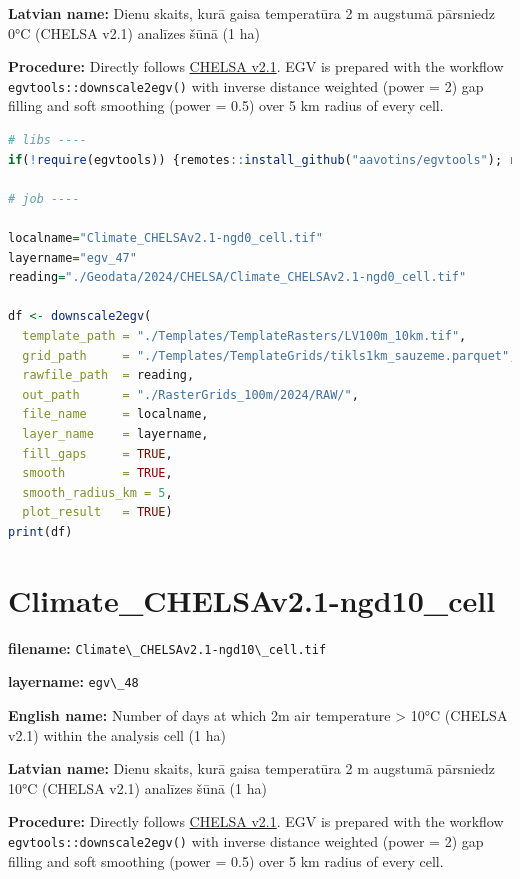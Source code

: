 \documentclass[
]{book}
\newcommand{\passthrough}[1]{#1}
\begin{document}
\textbf{Latvian name:} Dienu skaits, kurā gaisa temperatūra 2 m augstumā pārsniedz 0°C (CHELSA v2.1) analīzes šūnā (1 ha)

\textbf{Procedure:} Directly follows \hyperref[Ch04.11]{CHELSA v2.1}. EGV is prepared with the
workflow \passthrough{\lstinline!egvtools::downscale2egv()!} with inverse distance weighted (power = 2)
gap filling and soft smoothing (power = 0.5) over 5 km radius of every cell.

\begin{lstlisting}[language=R]
# libs ----
if(!require(egvtools)) {remotes::install_github("aavotins/egvtools"); require(egvtools)}

# job ----

localname="Climate_CHELSAv2.1-ngd0_cell.tif"
layername="egv_47"
reading="./Geodata/2024/CHELSA/Climate_CHELSAv2.1-ngd0_cell.tif"

df <- downscale2egv(
  template_path = "./Templates/TemplateRasters/LV100m_10km.tif",
  grid_path     = "./Templates/TemplateGrids/tikls1km_sauzeme.parquet",
  rawfile_path  = reading,
  out_path      = "./RasterGrids_100m/2024/RAW/",
  file_name     = localname,
  layer_name    = layername,
  fill_gaps     = TRUE,
  smooth        = TRUE,
  smooth_radius_km = 5,
  plot_result   = TRUE)
print(df)
\end{lstlisting}

\section{Climate\_CHELSAv2.1-ngd10\_cell}\label{ch06.048}

\textbf{filename:} \passthrough{\lstinline!Climate\_CHELSAv2.1-ngd10\_cell.tif!}

\textbf{layername:} \passthrough{\lstinline!egv\_48!}

\textbf{English name:} Number of days at which 2m air temperature \textgreater{} 10°C (CHELSA v2.1) within the analysis cell (1 ha)

\textbf{Latvian name:} Dienu skaits, kurā gaisa temperatūra 2 m augstumā pārsniedz 10°C (CHELSA v2.1) analīzes šūnā (1 ha)

\textbf{Procedure:} Directly follows \hyperref[Ch04.11]{CHELSA v2.1}. EGV is prepared with the
workflow \passthrough{\lstinline!egvtools::downscale2egv()!} with inverse distance weighted (power = 2)
gap filling and soft smoothing (power = 0.5) over 5 km radius of every cell.
\end{document}
